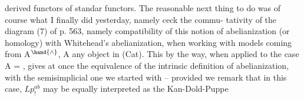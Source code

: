 derived functors of standar functors.  The reasonable next thing to do
was of course  what I finally did  yesterday,  namely ceck the commu-%
tativity of the diagram (7) of p. 563,  namely compatibility of this
notion of abelianization (or homology) with Whitehead's abelianization,
when working  with models coming from A$^{\hand{\wedge}}$,  A any object in (Cat).
This by the way,  when applied to the case  A = \hand{$\Delta$} ,  gives at once
the equivalence of the intrinsic definition of abelianization,  with
the semisimplicial one we started with  --  provided we remark that in
this case,  $Lp_!^{ab}$  may be equally interpreted as the Kan-Dold-Puppe

